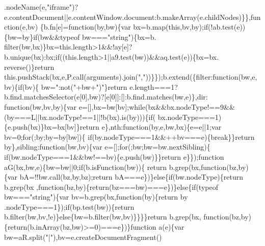 \begin{DoxyCode}
      .nodeName(e,\textcolor{stringliteral}{"iframe"})?e.contentDocument||e.contentWindow.document:b.makeArray(e.childNodes)\}\},\textcolor{keyword}{function}(e,bv)
      \{b.fn[e]=\textcolor{keyword}{function}(by,bw)\{var bx=b.map(\textcolor{keyword}{this},bv,by);\textcolor{keywordflow}{if}(!ab.test(e))\{bw=by\}\textcolor{keywordflow}{if}(bw&&typeof bw===\textcolor{stringliteral}{"string"})\{bx=b.
      filter(bw,bx)\}bx=this.length>1&&!ay[e]?b.unique(bx):bx;\textcolor{keywordflow}{if}((this.length>1||a9.test(bw))&&aq.test(e))\{bx=bx.
      reverse()\}\textcolor{keywordflow}{return} this.pushStack(bx,e,P.call(arguments).join(\textcolor{stringliteral}{","}))\}\});b.extend(\{filter:\textcolor{keyword}{function}(bw,e,bv)\{\textcolor{keywordflow}{if}(bv)\{
      bw=\textcolor{stringliteral}{":not("}+bw+\textcolor{stringliteral}{")"}\}\textcolor{keywordflow}{return} e.length===1?b.find.matchesSelector(e[0],bw)?[e[0]]:[]:b.find.matches(bw,e)\},dir:\textcolor{keyword}{
      function}(bw,bv,by)\{var e=[],bx=bw[bv];\textcolor{keywordflow}{while}(bx&&bx.nodeType!==9&&(by===L||bx.nodeType!==1||!b(bx).is(by)))\{\textcolor{keywordflow}{if}(
      bx.nodeType===1)\{e.push(bx)\}bx=bx[bv]\}\textcolor{keywordflow}{return} e\},nth:\textcolor{keyword}{function}(by,e,bw,bx)\{e=e||1;var bv=0;\textcolor{keywordflow}{for}(;by;by=by[bw])\{\textcolor{keywordflow}{
      if}(by.nodeType===1&&++bv===e)\{\textcolor{keywordflow}{break}\}\}\textcolor{keywordflow}{return} by\},sibling:\textcolor{keyword}{function}(bw,bv)\{var e=[];\textcolor{keywordflow}{for}(;bw;bw=bw.nextSibling)\{\textcolor{keywordflow}{
      if}(bw.nodeType===1&&bw!==bv)\{e.push(bw)\}\}\textcolor{keywordflow}{return} e\}\});\textcolor{keyword}{function} aG(bx,bw,e)\{bw=bw||0;\textcolor{keywordflow}{if}(b.isFunction(bw))\{\textcolor{keywordflow}{
      return} b.grep(bx,\textcolor{keyword}{function}(bz,by)\{var bA=!!bw.call(bz,by,bz);\textcolor{keywordflow}{return} bA===e\})\}\textcolor{keywordflow}{else}\{\textcolor{keywordflow}{if}(bw.nodeType)\{\textcolor{keywordflow}{return} b.grep(bx
      ,\textcolor{keyword}{function}(bz,by)\{\textcolor{keywordflow}{return}(bz===bw)===e\})\}\textcolor{keywordflow}{else}\{\textcolor{keywordflow}{if}(typeof bw===\textcolor{stringliteral}{"string"})\{var bv=b.grep(bx,\textcolor{keyword}{function}(by)\{\textcolor{keywordflow}{return} by
      .nodeType===1\});\textcolor{keywordflow}{if}(bp.test(bw))\{\textcolor{keywordflow}{return} b.filter(bw,bv,!e)\}\textcolor{keywordflow}{else}\{bw=b.filter(bw,bv)\}\}\}\}\textcolor{keywordflow}{return} b.grep(bx,\textcolor{keyword}{
      function}(bz,by)\{\textcolor{keywordflow}{return}(b.inArray(bz,bw)>=0)===e\})\}\textcolor{keyword}{function} a(e)\{var bw=aR.split(\textcolor{stringliteral}{"|"}),bv=e.createDocumentFragment()

\end{DoxyCode}
